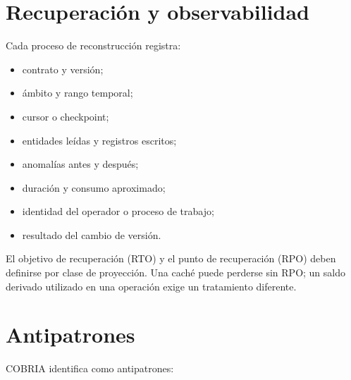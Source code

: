 \section{Recuperación y observabilidad}

Cada proceso de reconstrucción registra:

\begin{itemize}[leftmargin=*]
  \item contrato y versión;
  \item ámbito y rango temporal;
  \item cursor o checkpoint;
  \item entidades leídas y registros escritos;
  \item anomalías antes y después;
  \item duración y consumo aproximado;
  \item identidad del operador o proceso de trabajo;
  \item resultado del cambio de versión.
\end{itemize}

El objetivo de recuperación (RTO) y el punto de recuperación (RPO) deben definirse por
clase de proyección. Una caché puede perderse sin RPO; un saldo derivado utilizado en una
operación exige un tratamiento diferente.

\section{Antipatrones}

COBRIA identifica como antipatrones:

